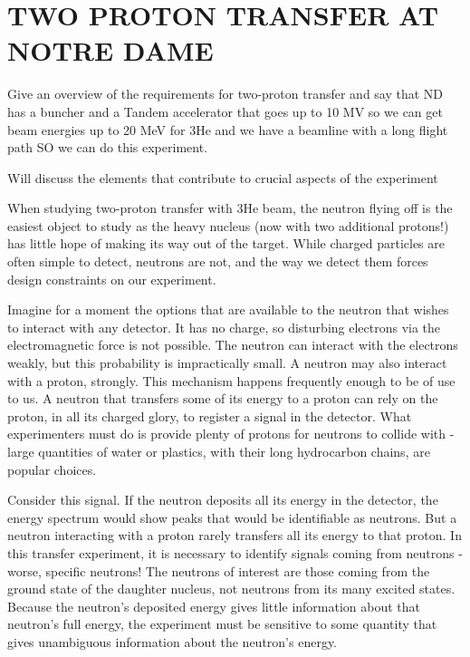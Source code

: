 %
%
%
%
%
%
%
%

%
%

\chapter{TWO PROTON TRANSFER AT NOTRE DAME}
\label{chap:2pExpt}

Give an overview of the requirements for two-proton transfer and say that ND has a buncher and a Tandem accelerator that goes up to 10 MV so we can get beam energies up to 20 MeV for 3He and we have a beamline with a long flight path SO we can do this experiment.

Will discuss the elements that contribute to crucial aspects of the experiment

When studying two-proton transfer with 3He beam, the neutron flying off is the easiest object to study as the heavy nucleus (now with two additional protons!) has little hope of making its way out of the target.  While charged particles are often simple to detect, neutrons are not, and the way we detect them forces design constraints on our experiment.

Imagine for a moment the options that are available to the neutron that wishes to interact with any detector.  It has no charge, so disturbing electrons via the electromagnetic force is not possible.  The neutron can interact with the electrons weakly, but this probability is impractically small.  A neutron may also interact with a proton, strongly.  This mechanism happens frequently enough to be of use to us.  A neutron that transfers some of its energy to a proton can rely on the proton, in all its charged glory, to register a signal in the detector.  What experimenters must do is provide plenty of protons for neutrons to collide with - large quantities of water or plastics, with their long hydrocarbon chains, are popular choices.

Consider this signal.  If the neutron deposits all its energy in the detector, the energy spectrum would show peaks that would be identifiable as neutrons.  But a neutron interacting with a proton rarely transfers all its energy to that proton.  In this transfer experiment, it is necessary to identify signals coming from neutrons - worse, specific neutrons!  The neutrons of interest are those coming from the ground state of the daughter nucleus, not neutrons from its many excited states.  Because the neutron's deposited energy gives little information about that neutron's full energy, the experiment must be sensitive to some quantity that gives unambiguous information about the neutron's energy.


